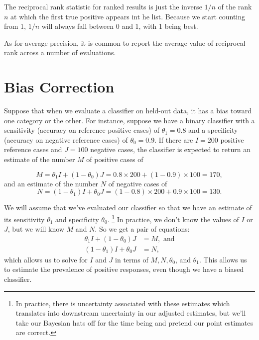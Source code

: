 The reciprocal rank statistic for ranked results is just the inverse
$1/n$ of the rank $n$ at which the first true positive appears int he
list.  Because we start counting from 1, $1/n$ will always fall
between 0 and 1, with 1 being best.  

As for average precision, it is common to report the average
value of reciprocal rank across a number of evaluations.  




\section{Bias Correction}

Suppose that when we evaluate a classifier on held-out data, it has a
bias toward one category or the other.  For instance, suppose we have
a binary classifier with a sensitivity (accuracy on reference positive
cases) of $\theta_1 = 0.8$ and a specificity (accuracy on negative
reference cases) of $\theta_0 = 0.9$.  If there are $I = 200$ positive
reference cases and $J = 100$ negative cases, the classifier is
expected to return an estimate of the number $M$ of positive cases
of 

\begin{equation}
M = \theta_1 I + (1-\theta_0) J = 0.8 \times 200 + (1 - 0.9) \times 100 = 170,
\end{equation}
%
and an estimate of the number $N$ of negative cases of
%
\begin{equation}
N = (1-\theta_1) I + \theta_0 J = (1-0.8) \times 200 +  0.9 \times 100 = 130.
\end{equation}

We will assume that we've evaluated our classifier so that we have an estimate of its
sensitivity $\theta_1$ and specificity $\theta_0$.%
%
\footnote{In practice, there is uncertainty associated with these
estimates which translates into downstream uncertainty in our adjusted
estimates, but we'll take our Bayesian hats off for the time being and
pretend our point estimates are correct.}
%
In practice, we
don't know the values of $I$ or $J$, but we will know $M$ and $N$.  So
we get a pair of equations:
%
\begin{align}
\theta_1 I + (1-\theta_0) J &= M, \mbox{ and}
\\[4pt]
(1-\theta_1) I + \theta_0 J &= N,
\end{align}
%
which allows us to solve for $I$ and $J$ in terms of $M, N, \theta_0$,
and $\theta_1$.  This allows us to estimate the prevalence of positive
responses, even though we have a biased classifier.


